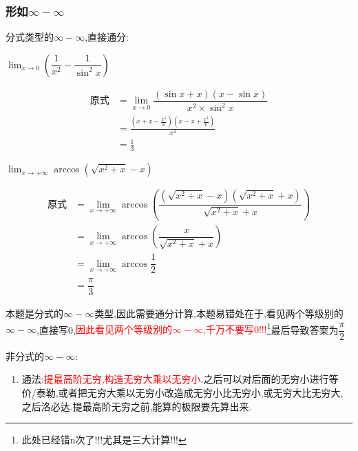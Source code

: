\documentclass[8pt a4paper, oneside, UTF8]{ctexbook}
\begin{document}
\begin{sloppypar}
    \subsubsection{形如$\infty -\infty$}
    分式类型的$\infty -\infty$,直接通分:
    \begin{problem}
    $\lim_{x\to 0}\left(\dfrac{1}{x^2}-\dfrac{1}{\sin ^2 x}\right)$
    \end{problem}
    \begin{solution}
        \begin{align*}
            \text{原式} & =\lim_{x\to 0}\dfrac{(\sin x +x)(x- \sin x)}{x^2 \times \sin^2 x} \\
                      & = \frac{(x+x-\frac{x^3}{6})(x-x+\frac{x^3}{6})}{x^4}              \\
                      & = \frac{1}{3}
        \end{align*}
    \end{solution}
    \begin{problem}
    $\lim_{x \to +\infty} \arccos \left( \sqrt{x^2+x} -x \right)$
    \end{problem}
    \begin{solution}
        \begin{align*}
            \text{原式} & = \lim_{x \to +\infty} \arccos \left( \dfrac{(\sqrt{x^2+x}-x)(\sqrt{x^2+x}+x)}{\sqrt{x^2+x}+x} \right) \\
                      & =  \lim_{x \to +\infty} \arccos \left( \dfrac{x}{\sqrt{x^2+x}+x} \right)                               \\
                      & =  \lim_{x \to +\infty} \arccos \dfrac{1}{2}                                                           \\
                      & = \dfrac{\pi}{3}
        \end{align*}
    \end{solution}
    \begin{note}
        本题是分式的$\infty-\infty$类型,因此需要通分计算,本题易错处在于,看见两个等级别的$\infty-\infty$,直接写0,\textcolor{red}{因此看见两个等级别的$\infty-\infty$,千万不要写0!!!}\footnote{此处已经错n次了!!!尤其是三大计算!!!}最后导致答案为$\dfrac{\pi}{2}$
    \end{note}
    非分式的$\infty -\infty$:
    \begin{enumerate}
        \item 通法:\textcolor{red}{提最高阶无穷,构造无穷大乘以无穷小}.之后可以对后面的无穷小进行等价/泰勒,或者把无穷大乘以无穷小改造成无穷小比无穷小,或无穷大比无穷大,之后洛必达.提最高阶无穷之前,能算的极限要先算出来.

\end{enumerate}
\end{sloppypar}
\end{document}

